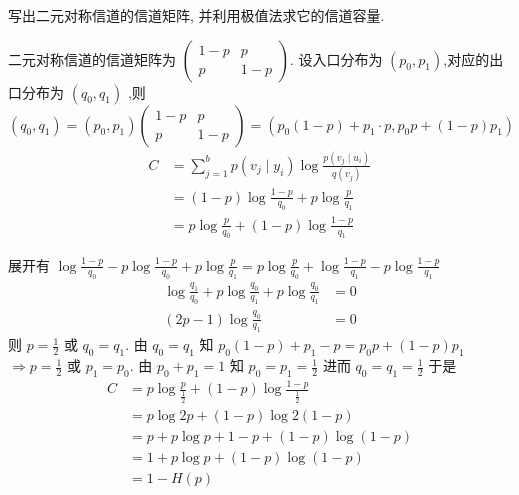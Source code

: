 \begin{tcolorbox}[breakable,colback=blue!5!white,colframe=blue!75!black,
 title= 解答题]

写出二元对称信道的信道矩阵, 并利用极值法求它的信道容量.
\tcblower

   二元对称信道的信道矩阵为 $ \left(\begin{array}{cc}1-p & p\\ p & 1-p\end{array}\right) $. 设入口分布为 $ \left(p_{0}, p_{1}\right) $,对应的出口分布为 $ \left(q_{0}, q_{1}\right) $ ,则 $ \left(q_{0}, q_{1}\right)=\left(p_{0}, p_{1}\right)\left(\begin{array}{cc}1-p & p \\ p & 1-p\end{array}\right)=\left(p_{0}(1-p)+p_{1} \cdot p, p_{0} p+(1-p) p_{1}\right) $
$$
\begin{aligned}
C & =\sum_{j=1}^{b} p\left(v_{j} \mid y_{i}\right) \log \frac{p\left(v_{j} \mid u_{i}\right)}{q\left(v_{j}\right)} \\
& =(1-p) \log \frac{1-p}{q_{0}}+p \log \frac{p}{q_{1}} \\
& =p \log \frac{p}{q_{0}}+(1-p) \log \frac{1-p}{q_{1}}
\end{aligned}
$$

展开有 $ \log \frac{1-p}{q_{0}}-p \log \frac{1-p}{q_{0}}+p \log \frac{p}{q_{1}}=p \log \frac{p}{q_{0}}+\log \frac{1-p}{q_{1}}-p \log \frac{1-p}{q_{1}} $
$$
\begin{aligned}
\log \frac{q_{1}}{q_{0}}+p \log \frac{q_{0}}{q_{1}}+p \log \frac{q_{0}}{q_{1}} & =0 \\
(2 p-1) \log \frac{q_{0}}{q_{1}} & =0
\end{aligned}
$$
则 $ p=\frac{1}{2} $ 或 $ q_{0}=q_{1} $.
由 $ q_{0}=q_{1} $ 知 $p_{0}(1-p)+p_{1}-p=p_{0} p+(1-p) p_{1}$ $\Rightarrow p=\frac{1}{2} \text { 或 } p_{1}=p_{0}$.
由 $ p_{0}+p_{1}=1 $ 知 $ p_{0}=p_{1}=\frac{1}{2} $ 进而 $ q_{0}=q_{1}=\frac{1}{2} $
于是
$$
\begin{aligned}
C & =p \log \frac{p}{\frac{1}{2}}+(1-p) \log \frac{1-p}{\frac{1}{2}} \\
& =p \log 2 p+(1-p) \log 2(1-p) \\
& =p+p \log p+1-p+(1-p) \log (1-p) \\
& =1+p \log p+(1-p) \log (1-p) \\
& =1-H(p)
\end{aligned}
$$
    
\end{tcolorbox}


